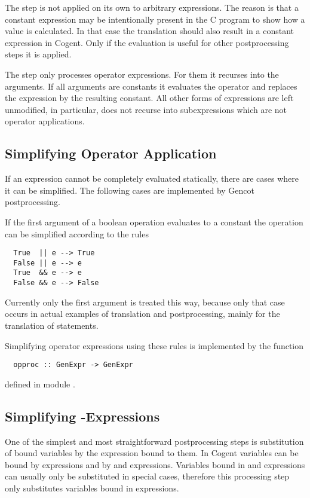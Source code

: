 The  step is not applied on its own to arbitrary expressions. The reason is that a constant
expression may be intentionally present in the C program to show how a value is calculated. In that case the 
translation should also result in a constant expression in Cogent. Only if the evaluation is useful for other 
postprocessing steps it is applied.

The  step only processes operator expressions. For them it recurses into the arguments. If all arguments
are constants it evaluates the operator and replaces the expression by the resulting constant. All other forms
of expressions are left unmodified, in particular,  does not recurse into subexpressions which are
not operator applications.

\subsection{Simplifying Operator Application}
\label{impl-post-op}

If an expression cannot be completely evaluated statically, there are cases where it can be simplified.
The following cases are implemented by Gencot postprocessing.

If the first argument of a boolean operation evaluates to a constant the operation can be simplified according 
to the rules
\begin{verbatim}
  True  || e --> True
  False || e --> e
  True  && e --> e
  False && e --> False
\end{verbatim}
Currently only the first argument is treated this way, because only that case occurs in actual examples of translation
and postprocessing, mainly for the translation of  statements.

Simplifying operator expressions using these rules is implemented by the function
\begin{verbatim}
  opproc :: GenExpr -> GenExpr
\end{verbatim}
defined in module .

\subsection{Simplifying -Expressions}
\label{impl-post-let}

One of the simplest and most straightforward postprocessing steps is substitution of bound variables by the
expression bound to them. In Cogent variables can be bound by  expressions and by  and 
expressions. Variables bound in  and  expressions can usually only be substituted in special cases, 
therefore this processing step only substitutes variables bound in  expressions. 

